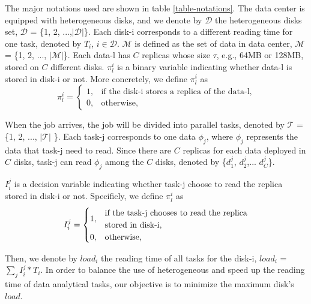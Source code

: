 \documentclass[conference]{IEEEtran}
\makeatletter
\newcommand{\tabincell}[2]{\begin{tabular}{@{}#1@{}}#2\end{tabular}}
\makeatother
\begin{document}
The major notations used are shown in table \ref{table-notations}. The data center is equipped with heterogeneous disks, and we denote by $\mathcal{D}$ the heterogeneous disks set, $\mathcal{D}$ = \{1, 2, ...,$|\mathcal{D}|$\}. Each disk-i corresponds to a different reading time for one task, denoted by $T_i$, $i \in \mathcal{D}$.
$\mathcal{M}$ is defined as the set of data in data center, $\mathcal{M}$ = \{1, 2, ..., $|\mathcal{M}|$\}. Each data-l has $C$ replicas whose size $\tau$, e.g., 64MB or 128MB,  stored on $C$ different disks. $\pi_l^{i}$ is a binary variable indicating whether data-l is stored in disk-i or not. More concretely, we define $\pi_l^{i}$ as
\begin{equation}
\pi_l^{i} =
\begin{cases}
1, &\text{if the disk-i stores a replica of the data-l,}\\
0, &\text{otherwise,}
\end{cases}\nonumber
\end{equation}

When the job arrives, the job will be divided into parallel tasks, denoted by $\mathcal{T}$ = \{1, 2,  ..., $\mathcal{|T|}$ \}. Each task-j corresponds to one data $\phi_j$, where $\phi_{j}$ represents the data that task-j need to read. Since there are $C$ replicas for each data deployed in $C$ disks, task-j can read $\phi_j$ among the $C$ disks, denoted by \{$d_{1}^j$, $d_{2}^j$,... $d_{C}^j$\}.


$I_i^j$ is a decision variable indicating whether task-j choose to read the replica stored in disk-i or not. Specificly, we define $\pi_l^{i}$ as
\begin{equation}
I_i^j =
\begin{cases}
1, &\text{\tabincell{l}{if the task-j chooses to read the replica \\stored in disk-i,}}\\
0, &\text{otherwise,}
\end{cases}\nonumber
\end{equation}

Then, we denote by $load_i$ the reading time of all tasks for the disk-i, $load_{i}$ = $\sum_{j}I_i^j*T_i$. In order to balance the use of heterogeneous and speed up the reading time of data analytical tasks, our objective is to minimize the maximum disk's $load$.
\end{document}
